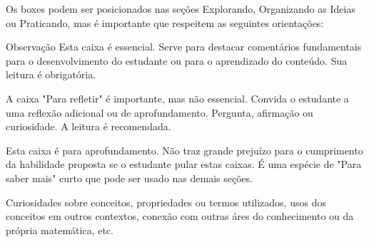 Os boxes podem ser posicionados nas seções Explorando, Organizando as Ideias ou Praticando, mas é importante que respeitem as seguintes orientações:

\begin{observation}{Observação}
Esta caixa é essencial. Serve para destacar comentários fundamentais para o desenvolvimento do estudante ou para o aprendizado do conteúdo. Sua leitura é obrigatória.
\end{observation}
\clearpage
\begin{reflection}
A caixa "Para refletir"{} é importante, mas não essencial. Convida o estudante a uma reflexão adicional ou de aprofundamento. Pergunta, afirmação ou curiosidade. A leitura é recomendada.
\end{reflection}

\begin{knowledge}
Esta caixa é para aprofundamento. Não traz grande prejuízo para o cumprimento da habilidade proposta se o estudante pular estas caixas. É uma espécie de "Para saber mais"{ curto que pode ser usado nas demais seções}.

Curiosidades sobre conceitos, propriedades ou termos utilizados, usos dos conceitos em outros contextos, conexão com outras áres do conhecimento ou da própria matemática, etc.
\end{knowledge}